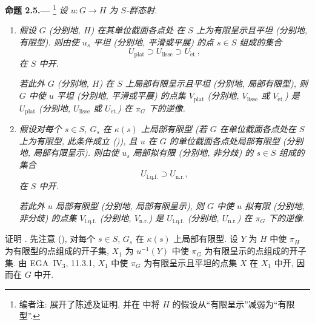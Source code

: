 
\medskip
{}\label{prop:sga3-VIB-2.5}%
\noindent\textbf{命题 2.5.---}%
\footnote{\label{note:sga3-VIB-20}编者注: 展开了陈述及证明,
并在 \textup{} 中将 \(H\)
的假设从``有限呈示''减弱为``有限型''.}
\emph{设 \(u:G\to H\) 为 \(S\)-群态射.}

\begin{enumerate}
\item[\textup{(i)}]\label{concl:sga3-VIB-2.5-i}
  \emph{假设 \(G\) (分别地, \(H\)) 在其单位截面各点处
  在 \(S\) 上为有限呈示且平坦 (分别地, 有限型). 则由使 \(u_s\)
  平坦 (分别地, 平滑或平展) 的点 \(s\in S\) 组成的集合}
  \[
    U_{\mathrm{plat}}
      \supset U_{\mathrm{lisse}}
      \supset U_{\mathrm{\acute{e}t.}},
  \]
  \emph{在 \(S\) 中开.}

  \emph{若此外 \(G\) (分别地, \(H\)) 在 \(S\) 上局部有限呈示且平坦
  (分别地, 局部有限型), 则 \(G\) 中使 \(u\) 平坦
  (分别地, 平滑或平展) 的点集 \(V_{\mathrm{plat}}\)
  (分别地, \(V_{\mathrm{lisse}}\) 或 \(V_{\mathrm{\acute{e}t.}}\))
  是 \(U_{\mathrm{plat}}\) (分别地, \(U_{\mathrm{lisse}}\)
  或 \(U_{\mathrm{\acute{e}t.}}\)) 在 \(\pi_G\) 下的逆像.}

\item[\textup{(ii)}]\label{concl:sga3-VIB-2.5-ii}
  \emph{假设对每个 \(s\in S\), \(G_s\) 在 \(\kappa(s)\) 上局部有限型
  (若 \(G\) 在单位截面各点处在 \(S\) 上为有限型,
  此条件成立 \textup{()}),
  且 \(u\) 在 \(G\) 的单位截面各点处局部有限型
  (分别地, 局部有限呈示). 则由使 \(u_s\) 局部拟有限
  (分别地, 非分歧) 的 \(s\in S\) 组成的集合}
  \[
    U_{\mathrm{l.q.f.}}\supset U_{\mathrm{n.r.}},
  \]
  \emph{在 \(S\) 中开.}

  \emph{若此外 \(u\) 局部有限型 (分别地, 局部有限呈示),
  则 \(G\) 中使 \(u\) 拟有限 (分别地, 非分歧) 的点集
  \(V_{\mathrm{l.q.f.}}\) (分别地, \(V_{\mathrm{n.r.}}\))
  是 \(U_{\mathrm{l.q.f.}}\) (分别地, \(U_{\mathrm{n.r.}}\))
  在 \(\pi_G\) 下的逆像.}
\end{enumerate}

证明 \textup{}.
先注意 (),
对每个 \(s\in S\), \(G_s\) 在 \(\kappa(s)\) 上局部有限型.
设 \(Y\) 为 \(H\) 中使 \(\pi_H\) 为有限型的点组成的开子集,
\(X_1\) 为 \(u^{-1}(Y)\) 中使 \(\pi_G\) 为有限呈示的点组成的开子集.
由 EGA~IV\(_3\), 11.3.1,
\(X_1\) 中使 \(\pi_G\) 为有限呈示且平坦的点集 \(X\)
在 \(X_1\) 中开, 因而在 \(G\) 中开.

